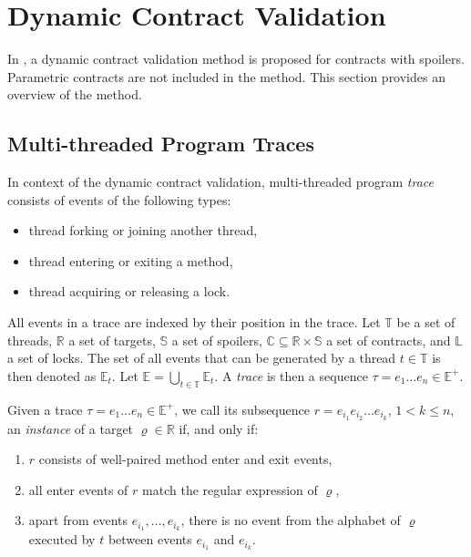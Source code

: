 \section{Dynamic Contract Validation}

In \cite{contracts}, a dynamic contract validation method is proposed for
contracts with spoilers. Parametric contracts are not included in the method.
This section provides an overview of the method.

\subsection{Multi-threaded Program Traces}

In context of the dynamic contract validation, multi-threaded program
\emph{trace} consists of events of the following types:
\begin{itemize}
    \item thread forking or joining another thread,
    \item thread entering or exiting a method,
    \item thread acquiring or releasing a lock.
\end{itemize}

All events in a trace are indexed by their position in the trace. Let
$\mathbb{T}$ be a set of threads, $\mathbb{R}$ a set of targets, $\mathbb{S}$ a
set of spoilers, $\mathbb{C} \subseteq \mathbb{R} \times \mathbb{S}$ a set of
contracts, and $\mathbb{L}$ a set of locks. The set of all events that can be
generated by a thread $t \in \mathbb{T}$ is then denoted as $\mathbb{E}_t$. Let
$\mathbb{E} = \bigcup_{t \in \mathbb{T}} \mathbb{E}_t$. A \emph{trace} is then a
sequence $\tau = e_1 \hdots e_n \in \mathbb{E}^+$.


Given a trace $\tau = e_1 \hdots e_n \in \mathbb{E}^+$, we call its subsequence
$r = e_{i_1} e_{i_2} \hdots e_{i_k}$, $1 < k \leq n$, an \emph{instance} of a
target $\varrho \in \mathbb{R}$ if, and only if:
\begin{enumerate}
    \item $r$ consists of well-paired method enter and exit events,
    \item all enter events of $r$ match the regular expression of $\varrho$,
    \item apart from events $e_{i_1},\ldots,e_{i_k}$, there is no event from the
        alphabet of $\varrho$ executed by $t$ between events $e_{i_1}$ and
        $e_{i_k}$.
\end{enumerate}

